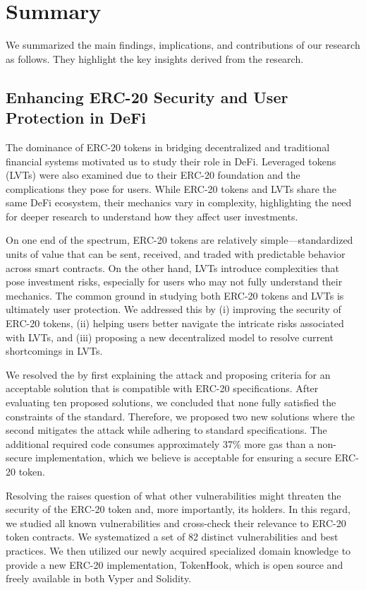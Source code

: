 \chapter{Summary}\label{ch:summary}
We summarized the main findings, implications, and contributions of our research as follows. They highlight the key insights derived from the research.

\section{Enhancing ERC-20 Security and User Protection in DeFi}
The dominance of ERC-20 tokens in bridging decentralized and traditional financial systems motivated us to study their role in DeFi. Leveraged tokens (LVTs) were also examined due to their ERC-20 foundation and the complications they pose for users. While ERC-20 tokens and LVTs share the same DeFi ecosystem, their mechanics vary in complexity, highlighting the need for deeper research to understand how they affect user investments.

On one end of the spectrum, ERC-20 tokens are relatively simple—standardized units of value that can be sent, received, and traded with predictable behavior across smart contracts. On the other hand, LVTs introduce complexities that pose investment risks, especially for users who may not fully understand their mechanics. The common ground in studying both ERC-20 tokens and LVTs is ultimately user protection. We addressed this by (i) improving the security of ERC-20 tokens, (ii) helping users better navigate the intricate risks associated with LVTs, and (iii) proposing a new decentralized model to resolve current shortcomings in LVTs.

We resolved the \mwa by first explaining the attack and proposing criteria for an acceptable solution that is compatible with ERC-20 specifications. After evaluating ten proposed solutions, we concluded that none fully satisfied the constraints of the standard. Therefore, we proposed two new solutions where the second mitigates the attack while adhering to standard specifications. The additional required code consumes approximately 37\% more gas than a non-secure implementation, which we believe is acceptable for ensuring a secure ERC-20 token.

Resolving the \mwa raises question of what other vulnerabilities might threaten the security of the ERC-20 token and, more importantly, its holders. In this regard, we studied all known vulnerabilities and cross-check their relevance to ERC-20 token contracts. We systematized a set of 82 distinct vulnerabilities and best practices. We then utilized our newly acquired specialized domain knowledge to provide a new ERC-20 implementation, TokenHook, which is open source and freely available in both Vyper and Solidity.

